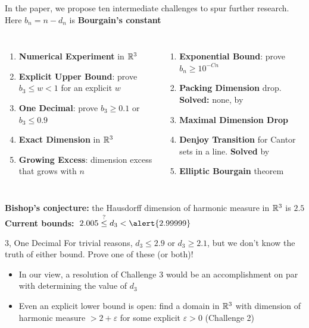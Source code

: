 In the paper, we propose ten intermediate challenges to spur further research. Here $b_n=n-d_n$ is \textbf{Bourgain's constant} 
\begin{columns}[1 1]
\begin{enumerate}
\item \textbf{Numerical Experiment} in $\mathbb{R}^3$
\item \textbf{Explicit Upper Bound}: prove $b_3\leq w<1$ for an explicit $w$
\item \textbf{One Decimal}: prove $b_3\geq0.1$ or $b_3\leq0.9$
\item \textbf{Exact Dimension} in $\mathbb{R}^3$
\item \textbf{Growing Excess}: dimension excess that grows with $n$
\end{enumerate}
\columnbreak
\begin{enumerate}
\item[6.] \textbf{Exponential Bound}: prove $b_n\geq10^{-Cn}$
\item[7.] \textbf{Packing Dimension} drop. \textcolor{c4}{\textbf{Solved:}} none, by 
\item[8.] \textbf{Maximal Dimension Drop}
\item[9.] \textbf{Denjoy Transition} for Cantor sets in a line. \textcolor{c4}{\textbf{Solved}} by 
\item[10.] \textbf{Elliptic Bourgain} theorem
\end{enumerate}
\end{columns}

\textbf{Bishop's conjecture:} the Hausdorff dimension of harmonic measure in $\mathbb{R}^3$ is $2.5$
\medskip
\textbf{Current bounds:} $\;2.005\stackrel{?}{\leq}d_3<\alert{2.99999}$
\begin{challenge}{3, One Decimal}
For trivial reasons, $d_3\leq2.9$ or $d_3\geq2.1$, but we don't know the truth of either bound. Prove one of these (or both)!
\end{challenge}
\begin{itemize}
\item In our view, a resolution of Challenge 3 would be an accomplishment on par with determining the value of $d_3$
\item Even an explicit lower bound is open: find a domain in $\mathbb{R}^3$ with dimension of harmonic measure $>2+\varepsilon$ for some explicit $\varepsilon>0$ (Challenge 2)
\end{itemize}

